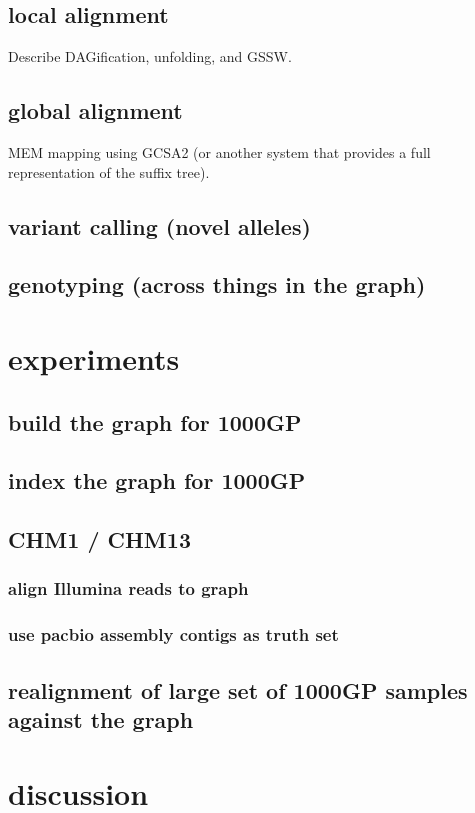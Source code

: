 \documentclass{article}
\begin{document}
\subsection{local alignment}

Describe DAGification, unfolding, and GSSW.

\subsection{global alignment}

MEM mapping using GCSA2 (or another system that provides a full representation of the suffix tree).

\subsection{variant calling (novel alleles)}

\subsection{genotyping (across things in the graph)}

\section{experiments}

\subsection{build the graph for 1000GP}

\subsection{index the graph for 1000GP}

\subsection{CHM1 / CHM13}
\subsubsection{align Illumina reads to graph}
\subsubsection{use pacbio assembly contigs as truth set}

\subsection{realignment of large set of 1000GP samples against the graph}


\section{discussion}

{}


\end{document}
